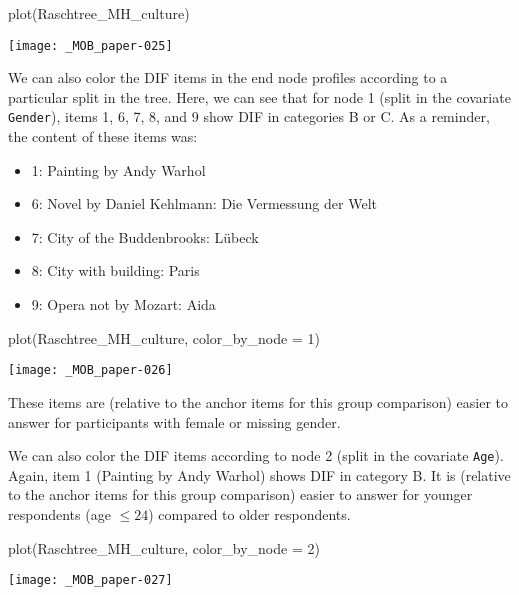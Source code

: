 \documentclass[doc,floatsintext,natbib]{apa7}
\begin{document}
\begin{Schunk}
\begin{Sinput}
 plot(Raschtree_MH_culture)
\end{Sinput}
\end{Schunk}
\texttt{[image: \_MOB\_paper-025]}

We can also color the DIF items in the end node profiles according to a particular split in the tree. Here, we can see that for node 1 (split in the covariate \texttt{Gender}), items 1, 6, 7, 8, and 9 show DIF in categories B or C. As a reminder, the content of these items was:

\begin{itemize}
\item 1: Painting by Andy Warhol
\item 6: Novel by Daniel Kehlmann: Die Vermessung der Welt
\item 7: City of the Buddenbrooks: Lübeck
\item 8: City with building: Paris
\item 9: Opera not by Mozart: Aida
\end{itemize}

\begin{Schunk}
\begin{Sinput}
 plot(Raschtree_MH_culture, color_by_node = 1)
\end{Sinput}
\end{Schunk}
\texttt{[image: \_MOB\_paper-026]}

These items are (relative to the anchor items for this group comparison) easier to answer for participants with female or missing gender. 


We can also color the DIF items according to node 2 (split in the covariate \texttt{Age}). Again, item 1 (Painting by Andy Warhol) shows DIF in category B. It is (relative to the anchor items for this group comparison) easier to answer for younger respondents (age $\leq 24$) compared to older respondents.  

\begin{Schunk}
\begin{Sinput}
 plot(Raschtree_MH_culture, color_by_node = 2)
\end{Sinput}
\end{Schunk}
\texttt{[image: \_MOB\_paper-027]}
\end{document}
